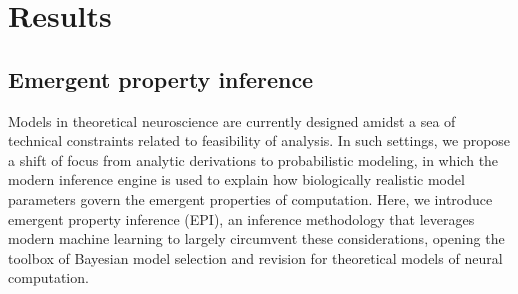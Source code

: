 \documentclass[11pt]{article}
\begin{document}



\section{Results}
\subsection{Emergent property inference}
Models in theoretical neuroscience are currently designed amidst a sea of technical constraints related to feasibility of analysis.
In such settings, we propose a shift of focus from analytic derivations to probabilistic modeling, in which the modern inference engine is used to explain how biologically realistic model parameters govern the emergent properties of computation.
Here, we introduce emergent property inference (EPI), an inference methodology that  leverages modern machine learning to largely circumvent these considerations, opening the toolbox of Bayesian model selection and revision for theoretical models of neural computation.  
\end{document}
